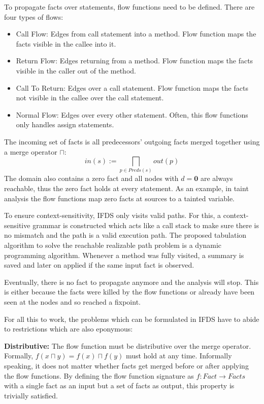\documentclass[../draft.tex]{subfiles}
\begin{document}
    To propagate facts over statements, flow functions need to be defined. There are four types of flows:
    \begin{itemize}
        \item Call Flow: Edges from call statement into a method. Flow function maps the facts visible in the callee into it. 
        \item Return Flow: Edges returning from a method. Flow function maps the facts visible in the caller out of the method.
        \item Call To Return: Edges over a call statement. Flow function maps the facts not visible in the callee over the call statement.
        \item Normal Flow: Edges over every other statement. Often, this flow functions only handles assign statements.
    \end{itemize}
    The incoming set of facts is all predecessors' outgoing facts merged together using a merge operator $\sqcap$: 
    $$in(s) := \bigsqcap_{p \in Preds(s)} out(p)$$
    The domain also contains a zero fact and all nodes with $d=\textbf{0}$ are always reachable, thus the zero fact holds at every statement. As an example, in taint analysis the flow functions map zero facts at sources to a tainted variable. 

    To ensure context-sensitivity, IFDS only visits valid paths. For this, a context-sensitive grammar is constructed which acts like a call stack to make sure there is no mismatch and the path is a valid execution path.
    The proposed tabulation algorithm to solve the reachable realizable path problem is a dynamic programming algorithm. Whenever a method was fully visited, a summary is saved and later on applied if the same input fact is observed. 

    Eventually, there is no fact to propagate anymore and the analysis will stop. This is either because the facts were killed by the flow functions or already have been seen at the nodes and so reached a fixpoint.

    For all this to work, the problems which can be formulated in IFDS have to abide to restrictions which are also eponymous:

    \textbf{Distributive:} The flow function must be distributive over the merge operator. Formally, $f(x \sqcap y) = f(x) \sqcap f(y)$ must hold at any time. Informally speaking, it does not matter whether facts get merged before or after applying the flow functions. By defining the flow function signature as $f: \mathit{Fact} \rightarrow \mathit{Facts}$ with a single fact as an input but a set of facts as output, this property is trivially satisfied.
\end{document}
